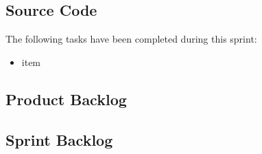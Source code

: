 \documentclass[a4paper,11pt]{article}
\begin{document}

\subsection{Source Code}



The following tasks have been completed during this sprint:
\begin{itemize}
	\item item
\end{itemize}

%

\subsection{Product Backlog}


\subsection{Sprint Backlog}

\end{document}
